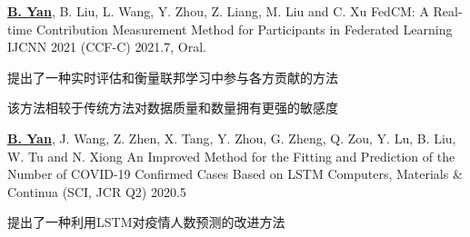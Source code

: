 \begin{cventries}
\cventry
{\underline{\textbf{B. Yan}}, B. Liu, L. Wang, Y. Zhou, Z. Liang, M. Liu and C. Xu} %
{FedCM: A Real-time Contribution Measurement Method for Participants in Federated Learning} %
{IJCNN 2021 (CCF-C)} %
{2021.7, Oral.} %
{
    \begin{cvitems} %
        \item {提出了一种实时评估和衡量联邦学习中参与各方贡献的方法}
        \item {该方法相较于传统方法对数据质量和数量拥有更强的敏感度}
    \end{cvitems}
}

\cventry
{\underline{\textbf{B. Yan}}, J. Wang, Z. Zhen, X. Tang, Y. Zhou, G. Zheng, Q. Zou, Y. Lu, B. Liu, W. Tu and N. Xiong} %
{An Improved Method for the Fitting and Prediction of the Number of COVID-19 Confirmed Cases Based on LSTM} %
{Computers, Materials \& Continua (SCI, JCR Q2)} %
{2020.5} %
{
    \begin{cvitems} %
        \item {提出了一种利用LSTM对疫情人数预测的改进方法}
    \end{cvitems}
}

\end{cventries}

